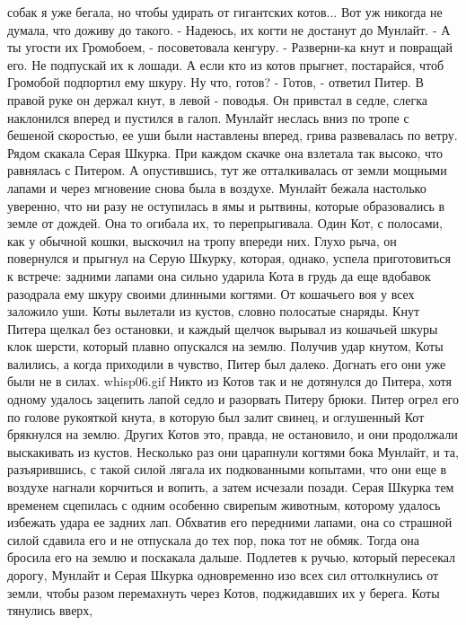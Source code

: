 собак я уже бегала, но чтобы удирать от гигантских котов... Вот уж 
никогда не думала, что доживу до такого.
    - Надеюсь, их когти не достанут до Мунлайт.
    - А ты угости их Громобоем, - посоветовала кенгуру. - Разверни-ка 
кнут и повращай его. Не подпускай их к лошади. А если кто из котов 
прыгнет, постарайся, чтоб Громобой подпортил ему шкуру. Ну что, готов?
    - Готов, - ответил Питер. В правой руке он держал кнут, в левой - 
поводья. Он привстал в седле, слегка наклонился вперед и пустился в 
галоп. Мунлайт неслась вниз по тропе с бешеной скоростью, ее уши были 
наставлены вперед, грива развевалась по ветру. Рядом скакала Серая 
Шкурка. При каждом скачке она взлетала так высоко, что равнялась с 
Питером. А опустившись, тут же отталкивалась от земли мощными лапами и 
через мгновение снова была в воздухе.
    Мунлайт бежала настолько уверенно, что ни разу не оступилась в ямы 
и рытвины, которые образовались в земле от дождей. Она то огибала их, 
то перепрыгивала.
    Один Кот, с полосами, как у обычной кошки, выскочил на тропу 
впереди них. Глухо рыча, он повернулся и прыгнул на Серую Шкурку, 
которая, однако, успела приготовиться к встрече: задними лапами она 
сильно ударила Кота в грудь да еще вдобавок разодрала ему шкуру своими 
длинными когтями.
    От кошачьего воя у всех заложило уши. Коты вылетали из кустов, 
словно полосатые снаряды. Кнут Питера щелкал без остановки, и каждый 
щелчок вырывал из кошачьей шкуры клок шерсти, который плавно опускался 
на землю. Получив удар кнутом, Коты валились, а когда приходили в 
чувство, Питер был далеко. Догнать его они уже были не в силах.
    {whisp06.gif}
    Никто из Котов так и не дотянулся до Питера, хотя одному удалось 
зацепить лапой седло и разорвать Питеру брюки. Питер огрел его по 
голове рукояткой кнута, в которую был залит свинец, и оглушенный Кот 
брякнулся на землю. Других Котов это, правда, не остановило, и они 
продолжали выскакивать из кустов. Несколько раз они царапнули когтями 
бока Мунлайт, и та, разъярившись, с такой силой лягала их подкованными 
копытами, что они еще в воздухе нагнали корчиться и вопить, а затем 
исчезали позади.
    Серая Шкурка тем временем сцепилась с одним особенно свирепым 
животным, которому удалось избежать удара ее задних лап. Обхватив его 
передними лапами, она со страшной силой сдавила его и не отпускала до 
тех пор, пока тот не обмяк. Тогда она бросила его на землю и поскакала 
дальше.
    Подлетев к ручью, который пересекал дорогу, Мунлайт и Серая Шкурка 
одновременно изо всех сил оттолкнулись от земли, чтобы разом 
перемахнуть через Котов, поджидавших их у берега. Коты тянулись вверх, 
